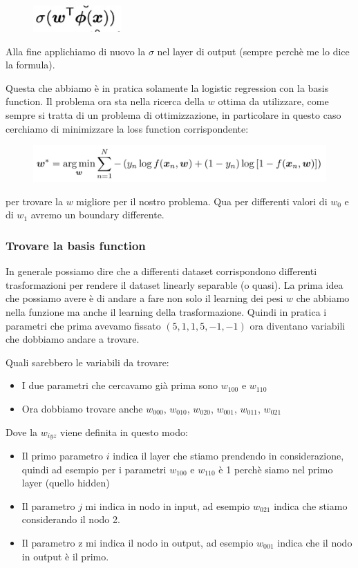 \documentclass[14pt]{extreport}
\begin{document}
\begin{figure}[H]
	\centering
	\includegraphics[width=0.3\linewidth]{364.jpeg}
\end{figure}

Alla fine applichiamo di nuovo la $\sigma$ nel layer di output (sempre perchè me lo dice la formula).

Questa che abbiamo è in pratica solamente la logistic regression con la basis function. Il problema ora sta nella ricerca della $w$ ottima da
utilizzare, come sempre si tratta di un problema di ottimizzazione, in particolare in questo caso cerchiamo di minimizzare la loss function
corrispondente:

\begin{figure}[H]
	\centering
	\includegraphics[width=0.7\linewidth]{363.jpeg}
\end{figure}

per trovare la $w$ migliore per il nostro problema. Qua per differenti valori di $w_0$ e di $w_1$ avremo un boundary differente.

\subsubsection{Trovare la basis function}

In generale possiamo dire che a differenti dataset corrispondono differenti trasformazioni per rendere il dataset linearly separable (o quasi). La
prima idea che possiamo avere è di andare a fare non solo il learning dei pesi $w$ che abbiamo nella funzione ma anche il learning della
trasformazione. Quindi in pratica i parametri che prima avevamo fissato $(5,1,1,5,-1,-1)$ ora diventano variabili che dobbiamo andare a trovare.

Quali sarebbero le variabili da trovare:
\begin{itemize}
	\item I due parametri che cercavamo già prima sono $w_{100}$ e $w_{110}$
	\item Ora dobbiamo trovare anche $w_{000}$, $w_{010}$, $w_{020}$, $w_{001}$, $w_{011}$, $w_{021}$
\end{itemize}

Dove la $w_{iyz}$ viene definita in questo modo:
\begin{itemize}
	\item Il primo parametro $i$ indica il layer che stiamo prendendo in considerazione, quindi ad esempio per i parametri $w_{100}$ e $w_{110}$ è 1
	perchè siamo nel primo layer (quello hidden)
	\item Il parametro $j$ mi indica in nodo in input, ad esempio $w_{021}$ indica che stiamo considerando il nodo 2.
	\item Il parametro z mi indica il nodo in output, ad esempio $w_{001}$ indica che il nodo in output è il primo.
\end{itemize}
\end{document}
